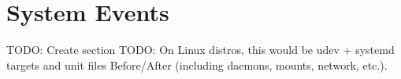 \section{System Events}
TODO: Create section
TODO: On Linux distros, this would be udev + systemd targets and unit files Before/After (including daemons, mounts, network, etc.).
